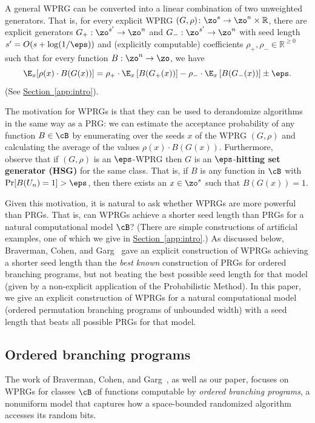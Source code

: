 \documentclass[11pt]{article}
\newcommand{\expref}[2]{\texorpdfstring{\hyperref[#2]{#1~\ref{#2}}}{#1~\ref{#2}}}
\newcommand{\R}{{\mathbb R}}
\begin{document}
A general WPRG can be converted into a linear combination of two unweighted generators. That is, for every explicit WPRG 
$(G,\rho) \colon \zo^s \to \zo^n\times \R$, there are 
explicit generators $G_+ : \zo^{s'}\rightarrow \zo^n$ and $G_- : \zo^{s'}\rightarrow \zo^n$ with seed length
$s'=O(s+\log(1/\eps))$ and (explicitly computable) coefficients $\rho_+,\rho_-\in \R^{\geq 0}$ such that for every function $B : \zo^n\rightarrow \zo$, we have %
$$\E_x[\rho(x)\cdot B(G(x))] = 
\rho_+\cdot \E_x\left[B(G_+(x))\right] - \rho_-\cdot \E_x\left[B(G_-(x))\right]\pm \eps.$$
(See \expref{Section}{app:intro}).

The motivation for WPRGs is that they can be used to derandomize algorithms in the same way as a PRG:
we can estimate the acceptance probability of any function $B\in \cB$ by enumerating over the seeds $x$ of the WPRG $(G,\rho)$ and calculating the average of the values $\rho(x)\cdot B(G(x))$.
Furthermore, ~\cite{BravermanCoGa18} observe that if $(G,\rho)$ is an $\eps$-WPRG then $G$ is an $\eps$-\textbf{hitting set generator (HSG)} for the same class.  That is, if $B$ is any function in $\cB$ with $\Pr[B(U_n)=1]>\eps$, then there exists an $x\in \zo^s$ such that $B(G(x))=1$.

Given this motivation, it is natural to ask whether WPRGs are more powerful than PRGs.  That is, can WPRGs achieve a shorter seed length than PRGs for a natural computational model $\cB$?  (There are simple constructions of artificial examples, one of which we give in \expref{Section}{app:intro}.) 
As discussed below, Braverman, Cohen, and Garg~\cite{BravermanCoGa18} gave an explicit construction of WPRGs achieving a shorter seed length than the \emph{best known} construction of PRGs for ordered branching programs, but not beating the best possible seed length for that model (given by a non-explicit application of the Probabilistic Method). In this %
paper,  %
we give an explicit construction of WPRGs for a natural computational model (ordered permutation branching programs of unbounded width) with a
seed length that beats all possible PRGs for that model. 


\subsection{Ordered branching programs}

    The work of Braverman, Cohen, and Garg~\cite{BravermanCoGa18}, as well as our paper, focuses
    on WPRGs for classes $\cB$ of functions computable by \emph{ordered branching programs}, a nonuniform model that captures how a space-bounded randomized algorithm accesses its random bits.
	
\end{document}
